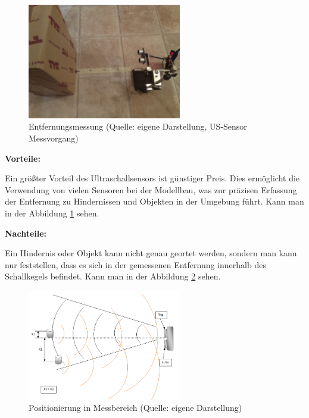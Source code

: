 \begin{figure}[!h]  %
	\centering\includegraphics[width=0.6\textwidth]{images/Bild-1.jpg}
	\caption{Entfernungsmessung \newline (Quelle: eigene Darstellung, US-Sensor Messvorgang)}
	\label{bild_1} %
\end{figure}

\textbf{Vorteile:}  %

Ein größter Vorteil des Ultraschallsensors ist günstiger Preis. Dies ermöglicht die Verwendung von vielen Sensoren bei der Modellbau, was zur präzisen Erfassung der Entfernung zu Hindernissen und Objekten in der Umgebung führt. Kann man in der Abbildung \ref{bild_1} sehen.

\par\bigskip %
\textbf{Nachteile:}  %

Ein Hindernis oder Objekt kann nicht genau geortet werden, sondern man kann nur feststellen, dass es sich in der gemessenen Entfernung innerhalb des Schallkegels befindet. Kann man in der Abbildung \ref{bild_2} sehen.

\begin{figure}[ht]  %
	\centering\includegraphics[width=0.6\textwidth]{images/Bild-2.png}
	\caption{Positionierung in Messbereich \newline (Quelle: eigene Darstellung)}
	\label{bild_2} %
\end{figure}

